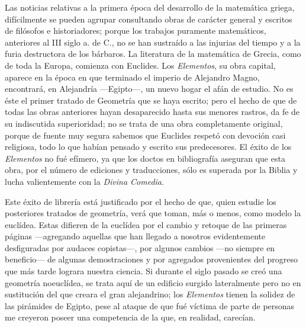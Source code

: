 \documentclass[a4paper, 12pt, draft]{article}
\begin{document}
{%




 Las noticias relativas a la primera época del desarrollo de la matemática griega, difícilmente se
pueden agrupar consultando obras de carácter general y escritos de filósofos e historiadores; porque
los trabajos puramente matemáticos, anteriores al III siglo a. de C., no se han sustraído a las injurias del tiempo y a la furia destructora de los bárbaros. La literatura de la matemática de Grecia, como de toda la Europa, comienza con Euclides. Los \textit{ Elementos}, su obra capital, aparece en la época en que terminado el imperio de Alejandro Magno, encontrará, en Alejandría ---Egipto---, un nuevo hogar el afán de estudio. No es éste el primer tratado de Geometría
que se haya escrito; pero el hecho de  que de todas las obras 	anteriores hayan desaparecido hasta sus menores rastros, da fe de su indiscutida superioridad; no se trata de una obra completamente original, porque de fuente muy segura sabemos que Euclides respetó con devoción casi religiosa, todo lo que habían pensado y escrito sus predecesores. El éxito de los \textit{ Elementos} no fué efímero, ya que los doctos en bibliografía aseguran que esta obra, por el número de ediciones y traducciones, sólo es superada por la Biblia y lucha valientemente con la \textit{ Divina Comedia}.

Este éxito de librería está justificado por el hecho de que, quien estudie los posteriores tratados de geometría, verá que toman, más o menos, como modelo la euclídea. Estas difieren de la euclídea por el cambio y retoque de las primeras páginas ---agregando aquellas que han llegado a nosotros
evidentemente desfiguradas por audaces copistas---,
por algunos cambios ---no siempre en beneficio---
de algunas demostraciones y por agregados provenientes del progreso que más tarde lograra nuestra
ciencia. Si durante el siglo pasado se creó una geometría noeuclídea, se trata aquí de un edificio surgido lateralmente pero no en sustitución del que creara el gran alejandrino; los \textit{ Elementos} tienen la solidez de las pirámides de Egipto, pese al ataque de que fué víctima de parte de personas me creyeron poseer una competencia de la que, en realidad, carecían.

}
\end{document}

